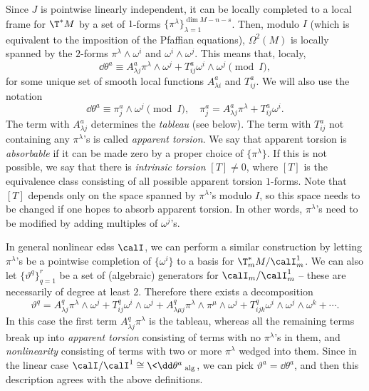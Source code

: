 Since $J$ is pointwise linearly independent, it can be locally completed to a local frame for $\T^\ast M$ by a set of $1$-forms $\{\pi^\lambda\}_{\lambda=1}^{\dim M-n-s}$. Then, modulo $I$ (which is equivalent to the imposition of the Pfaffian equations), $\Omega^2(M)$ is locally spanned by the $2$-forms $\pi^\lambda\wedge \omega^i$ and $\omega^i\wedge\omega^j$. This means that, localy,
\[\dd\theta^a\equiv A^a_{\lambda j}\pi^\lambda\wedge\omega^j+T^a_{ij}\omega^i\wedge\omega^j \pmod{I},\label{eq def tableau+torsion}\]
for some unique set of smooth local functions $A^a_{\lambda i}$ and $T^a_{ij}$. We will also use the notation 
\[\dd\theta^a\equiv \pi^a_j\wedge\omega^j\pmod{I},\quad \pi^a_j=A^a_{\lambda j}\pi^\lambda+T^a_{ij}\omega^i.\]
The term with $A^a_{\lambda j}$ determines the \emph{tableau} (see below). The term with $T^a_{ij}$ not containing any $\pi^\lambda$'s is called \emph{apparent torsion}. We say that apparent torsion is \emph{absorbable} if it can be made zero by a proper choice of $\{\pi^\lambda\}$. If this is not possible, we say that there is \emph{intrinsic torsion} $[T]\neq 0$, where $[T]$ is the equivalence class consisting of all possible apparent torsion $1$-forms. Note that $[T]$ depends only on the space spanned by $\pi^\lambda$'s modulo $I$, so this space needs to be changed if one hopes to absorb apparent torsion. In other words, $\pi^\lambda$'s need to be modified by adding multiples of $\omega^j$'s.

\begin{rem}
    In general nonlinear \glspl{eds} $\calI$, we can perform a similar construction by letting $\pi^\lambda$'s be a pointwise completion of $\{\omega^i\}$ to a basis for $\T_m^\ast M\slash \calI^1_m$. We can also let  $\{\vartheta^q\}_{q=1}^r$  be a set of (algebraic) generators for $\calI_m\slash \calI^1_m$ -- these are necessarily of degree at least $2$. Therefore there exists a decomposition 
    \[\vartheta^q=A^q_{\lambda j}\pi^\lambda\wedge\omega^j+T^q_{ij}\omega^i\wedge\omega^j + A^q_{\lambda\mu j}\pi^\lambda\wedge\pi^\mu\wedge \omega^j + T^q_{ijk}\omega^i\wedge\omega^j\wedge\omega^k+\cdots. \]
    In this case the first term $A^q_{\lambda j}\pi^\lambda$ is the tableau, whereas all the remaining terms break up into \emph{apparent torsion} consisting of terms with no $\pi^\lambda$'s in them, and \emph{nonlinearity} consisting of terms with two or more $\pi^\lambda$ wedged into them. Since in the linear case $\calI\slash \calI^1\cong \<\dd\theta^a\>_{\mathrm{alg}}$, we can pick $\vartheta^a=\dd\theta^a$, and then this description agrees with the above definitions.
\end{rem}



